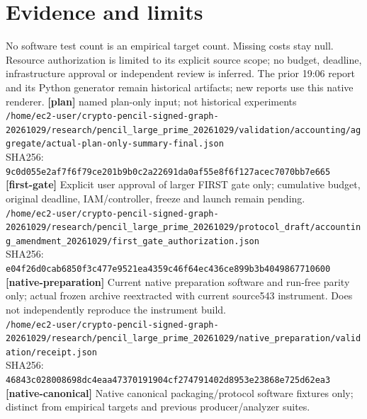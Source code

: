 \documentclass[11pt]{article}
\begin{document}
\section*{Evidence and limits}
No software test count is an empirical target count. Missing costs stay null. Resource authorization is limited to its explicit source scope; no budget, deadline, infrastructure approval or independent review is inferred. The prior 19:06 report and its Python generator remain historical artifacts; new reports use this native renderer.
\small
\textbf{[plan]} named plan-only input; not historical experiments\\
\texttt{/\allowbreak{}home/\allowbreak{}ec2-user/\allowbreak{}crypto-pencil-signed-graph-20261029/\allowbreak{}research/\allowbreak{}pencil\_large\_prime\_20261029/\allowbreak{}validation/\allowbreak{}accounting/\allowbreak{}aggregate/\allowbreak{}actual-plan-only-summary-final.json}\\
SHA256: \texttt{9c0d055e2af7f6f79ce201b9b0c2a22691da0af55e8f6f127acec7070bb7e665}\\
\textbf{[first-gate]} Explicit user approval of larger FIRST gate only; cumulative budget, original deadline, IAM/controller, freeze and launch remain pending.\\
\texttt{/\allowbreak{}home/\allowbreak{}ec2-user/\allowbreak{}crypto-pencil-signed-graph-20261029/\allowbreak{}research/\allowbreak{}pencil\_large\_prime\_20261029/\allowbreak{}protocol\_draft/\allowbreak{}accounting\_amendment\_20261029/\allowbreak{}first\_gate\_authorization.json}\\
SHA256: \texttt{e04f26d0cab6850f3c477e9521ea4359c46f64ec436ce899b3b4049867710600}\\
\textbf{[native-preparation]} Current native preparation software and run-free parity only; actual frozen archive reextracted with current source543 instrument. Does not independently reproduce the instrument build.\\
\texttt{/\allowbreak{}home/\allowbreak{}ec2-user/\allowbreak{}crypto-pencil-signed-graph-20261029/\allowbreak{}research/\allowbreak{}pencil\_large\_prime\_20261029/\allowbreak{}native\_preparation/\allowbreak{}validation/\allowbreak{}receipt.json}\\
SHA256: \texttt{46843c028008698dc4eaa47370191904cf274791402d8953e23868e725d62ea3}\\
\textbf{[native-canonical]} Native canonical packaging/protocol software fixtures only; distinct from empirical targets and previous producer/analyzer suites.\\
\end{document}
